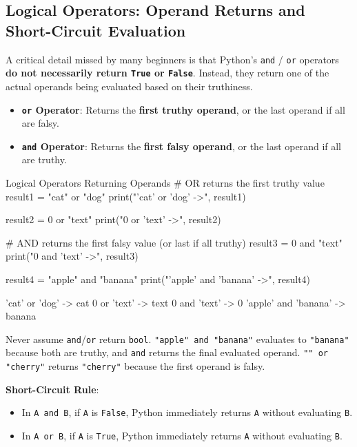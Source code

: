 \subsection{Logical Operators: Operand Returns and Short-Circuit Evaluation}

A critical detail missed by many beginners is that Python's \texttt{and} / \texttt{or} operators \textbf{do not necessarily return \texttt{True} or \texttt{False}}. Instead, they return one of the actual operands being evaluated based on their truthiness.

\begin{itemize}[leftmargin=1.5em]
    \item \textbf{\texttt{or} Operator}: Returns the \textbf{first truthy operand}, or the last operand if all are falsy.
    \item \textbf{\texttt{and} Operator}: Returns the \textbf{first falsy operand}, or the last operand if all are truthy.
\end{itemize}

\begin{pythoncode}{Logical Operators Returning Operands}
# OR returns the first truthy value
result1 = "cat" or "dog"
print("'cat' or 'dog' ->", result1)

result2 = 0 or "text"
print("0 or 'text'    ->", result2)

# AND returns the first falsy value (or last if all truthy)
result3 = 0 and "text"
print("0 and 'text'   ->", result3)

result4 = "apple" and "banana"
print("'apple' and 'banana' ->", result4)
\end{pythoncode}
\begin{outputbox}
'cat' or 'dog' -> cat
0 or 'text'    -> text
0 and 'text'   -> 0
'apple' and 'banana' -> banana
\end{outputbox}

\begin{examtip}
Never assume \texttt{and}/\texttt{or} return \texttt{bool}. \texttt{"apple" and "banana"} evaluates to \texttt{"banana"} because both are truthy, and \texttt{and} returns the final evaluated operand. \texttt{"" or "cherry"} returns \texttt{"cherry"} because the first operand is falsy.
\end{examtip}

\textbf{Short-Circuit Rule}:
\begin{itemize}
    \item In \texttt{A and B}, if \texttt{A} is \texttt{False}, Python immediately returns \texttt{A} without evaluating \texttt{B}.
    \item In \texttt{A or B}, if \texttt{A} is \texttt{True}, Python immediately returns \texttt{A} without evaluating \texttt{B}.
\end{itemize}

